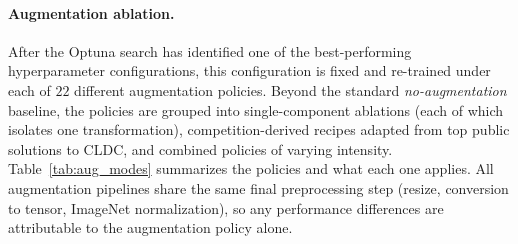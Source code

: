 \documentclass[conference]{IEEEtran}
\begin{document}
\paragraph{Augmentation ablation.}
After the Optuna search has identified one of the best-performing hyperparameter configurations, this configuration is fixed and re-trained under each of $22$ different augmentation policies. Beyond the standard \emph{no-augmentation} baseline, the policies are grouped into single-component ablations (each of which isolates one transformation), competition-derived recipes adapted from top public solutions to CLDC, and combined policies of varying intensity. Table~\ref{tab:aug_modes} summarizes the policies and what each one applies. All augmentation pipelines share the same final preprocessing step (resize, conversion to tensor, ImageNet normalization), so any performance differences are attributable to the augmentation policy alone.
\end{document}

